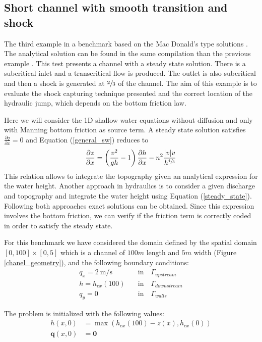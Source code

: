 \documentclass[a4paper,12pt]{elsarticle}
\newcommand{\pder}[2]{\frac{\partial#1}{\partial#2}}
\newcommand{\abs}[1]{\lvert#1\rvert}
\begin{document}
\subsection{Short channel with smooth transition and shock}

The third example in a benchmark based on the Mac Donald's type solutions \cite{macdonald1997}. The analytical solution can be found in the same compilation than the previous example \cite{delestre2013}. This test presents a channel with a steady state solution. There is a subcritical inlet and a transcritical flow is produced. The outlet is also subcritical and then a shock is generated at $\sfrac{2}{3}$ of the channel. The aim of this example is to evaluate the shock capturing technique presented and the correct location of the hydraulic jump, which depends on the bottom friction law.

Here we will consider the 1D shallow water equations without diffusion and only with Manning bottom friction as source term. A steady state solution satisfies $\pder{q}{x}=0$ and Equation (\ref{general_sw}) reduces to
\begin{equation} \label{steady_state}
\pder{z}{x} = \left(\frac{v^2}{gh}-1\right) \pder{h}{x} - n^2\frac{\abs{v}v}{h^{\sfrac{4}{3}}}
\end{equation}
This relation allows to integrate the topography given an analytical expression for the water height. Another approach in hydraulics is to consider a given discharge and topography and integrate the water height using Equation (\ref{steady_state}). Following both approaches exact solutions can be obtained. Since this expression involves the bottom friction, we can verify if the friction term is correctly coded in order to satisfy the steady state.

For this benchmark we have considered the domain defined by the spatial domain $[0,100]\times[0,5]$ which is a channel of $100m$ length and $5m$ width (Figure \ref{chanel_geometry}), and the following boundary conditions:
\begin{equation}
\begin{split}
    q_x = 2\ \text{m/s} \quad &\text{in} \quad \Gamma_{upstream} \\
    h = h_{ex}(100) \quad &\text{in} \quad \Gamma_{downstream} \\
    q_y = 0 \quad &\text{in} \quad \Gamma_{walls}
\end{split}
\end{equation}

The problem is initialized with the following values:
\begin{equation}
\begin{split}
    h(x,0) &= \max(h_{ex}(100) - z(x), h_{ex}(0)) \\
    \mathbf{q}(x,0) &= \mathbf{0}
\end{split}
\end{equation}
\end{document}
